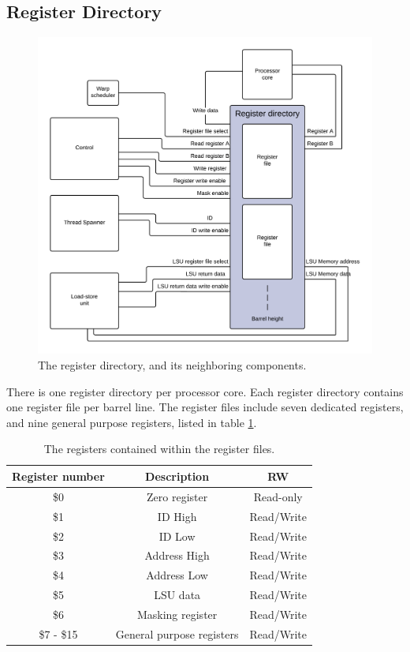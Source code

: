 \subsection{Register Directory}
\begin{figure}[H]
	\centering
	\includegraphics[width=\textwidth]{../gpu/diagrams/register_directory.png}
	\caption{The register directory, and its neighboring components.}
	\label{fig:register_directory}
\end{figure}

There is one register directory per processor core.
Each register directory contains one register file per barrel line.
The register files include seven dedicated registers, and nine general purpose registers, listed in table \ref{tab:registers_overview}.

\begin{table}[H]
	\centering
	\begin{tabular}{|c|c|c|}
		\hline Register number & Description & RW \\ 
		\hline \$0 & Zero register & Read-only \\ 
		\hline \$1 & ID High & Read/Write \\ 
		\hline \$2 & ID Low & Read/Write \\ 
		\hline \$3 & Address High & Read/Write \\ 
		\hline \$4 & Address Low & Read/Write \\ 
		\hline \$5 & LSU data & Read/Write \\ 
		\hline \$6 & Masking register & Read/Write \\ 
		\hline \$7 - \$15 & General purpose registers & Read/Write \\ 
		\hline 
	\end{tabular} 
	\caption{The registers contained within the register files.}
	\label{tab:registers_overview}
\end{table}

